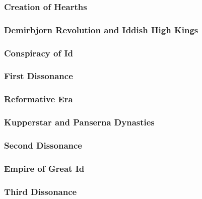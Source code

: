 			\subsubsection{Creation of Hearths}\par
			
			\subsubsection{Demirbjorn Revolution and Iddish High Kings}\par
			
			\subsubsection{Conspiracy of Id}\par
			
			\subsubsection{First Dissonance}\par
			
			\subsubsection{Reformative Era}\par
			
			\subsubsection{Kupperstar and Panserna Dynasties}\par
			
			\subsubsection{Second Dissonance}\par
			
			\subsubsection{Empire of Great Id}\par
			
			\subsubsection{Third Dissonance}\par
			
